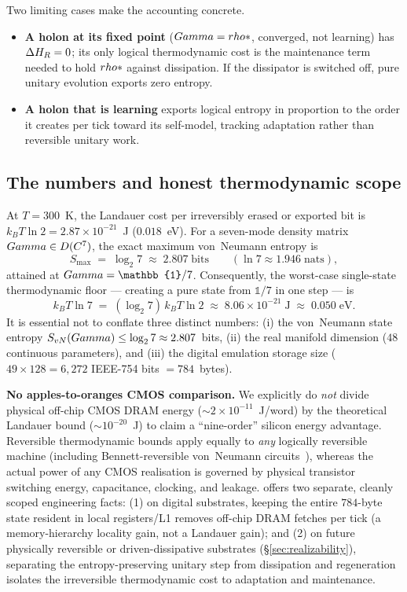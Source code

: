 Two limiting cases make the accounting concrete.
\begin{itemize}[leftmargin=1.5em,itemsep=1pt]
  \item \textbf{A holon at its fixed point} ($Gamma=rho*$, converged, not
        learning) has $\Delta H_{R}=0$; its only logical thermodynamic
        cost is the maintenance term needed to hold $rho*$ against
        dissipation. If the dissipator is switched off, pure unitary evolution
        exports zero entropy.
  \item \textbf{A holon that is learning} exports logical entropy in proportion
        to the order it creates per tick toward its self-model, tracking
        adaptation rather than reversible unitary work.
\end{itemize}

\subsection{The numbers and honest thermodynamic scope}

At $T=300$~K, the Landauer cost per irreversibly erased or exported bit is
$k_B T\ln 2 = 2.87\times10^{-21}$~J ($0.018$~eV). For a seven-mode density
matrix $Gamma\in D(C^7)$, the exact maximum von~Neumann entropy is
\begin{equation*}
S_{\max} \;=\; \log_2 7 \;\approx\; 2.807\;\text{bits}
\qquad (\ln 7 \approx 1.946\;\text{nats}),
\end{equation*}
attained at $\Gam=\mathbb{1}/7$. Consequently, the worst-case single-state
thermodynamic floor --- creating a pure state from $\mathbb{1}/7$ in one step
--- is
\[
k_B T\ln 7 \;=\; (\log_2 7)\,k_B T\ln 2 \;\approx\; 8.06\times10^{-21}\;\text{J}
\;\approx\; 0.050\;\text{eV}.
\]
It is essential not to conflate three distinct numbers: (i) the von~Neumann
state entropy $S_{vN}(Gamma)\le\log_2 7\approx 2.807$~bits, (ii) the
real manifold dimension ($48$ continuous parameters), and (iii) the digital
emulation storage size ($49\times 128 = 6{,}272$ IEEE-754 bits $= 784$~bytes).

\noindent\textbf{No apples-to-oranges CMOS comparison.} We explicitly do
\emph{not} divide physical off-chip CMOS DRAM energy ($\sim\!2\times10^{-11}$~J/word)
by the theoretical Landauer bound ($\sim\!10^{-20}$~J) to claim a ``nine-order''
silicon energy advantage. Reversible thermodynamic bounds apply equally to
\emph{any} logically reversible machine (including Bennett-reversible
von~Neumann circuits~\cite{bennett1973}), whereas the actual power of any CMOS
realisation is governed by physical transistor switching energy, capacitance,
clocking, and leakage. \TALOS{} offers two separate, cleanly scoped engineering
facts: (1) on digital substrates, keeping the entire $784$-byte state resident
in local registers/L1 removes off-chip DRAM fetches per tick (a memory-hierarchy
locality gain, not a Landauer gain); and (2) on future physically reversible or
driven-dissipative substrates (\S\ref{sec:realizability}), separating the
entropy-preserving unitary step from dissipation and regeneration isolates the
irreversible thermodynamic cost to adaptation and maintenance.

